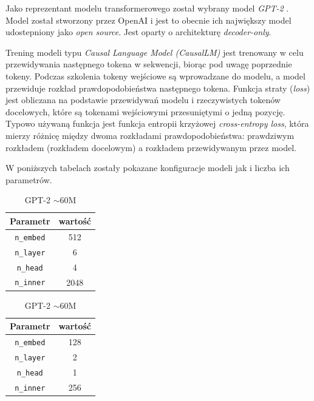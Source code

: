 \documentclass[data-science]{agh-wi} %
\begin{document}
Jako reprezentant modelu transformerowego został wybrany model \textit{GPT-2} \cite{gpt2}. Model został stworzony przez OpenAI i jest to obecnie ich największy model udostepniony jako \textit{open source}. Jest oparty o architekturę \textit{decoder-only}.

Trening modeli typu \textit{Causal Language Model (CausalLM)} jest trenowany w celu przewidywania następnego tokena w sekwencji, biorąc pod uwagę poprzednie tokeny. Podczas szkolenia tokeny wejściowe są wprowadzane do modelu, a model przewiduje rozkład prawdopodobieństwa następnego tokena. Funkcja straty (\textit{loss}) jest obliczana na podstawie przewidywań modelu i rzeczywistych tokenów docelowych, które są tokenami wejściowymi przesuniętymi o jedną pozycję. Typowo używaną funkcja jest funkcja entropii krzyżowej \textit{cross-entropy loss}, która mierzy różnicę między dwoma rozkładami prawdopodobieństwa: prawdziwym rozkładem (rozkładem docelowym) a rozkładem przewidywanym przez model.

W poniższych tabelach zostały pokazane konfiguracje modeli jak i liczba ich parametrów.

\begin{table}[!htb]
    \begin{minipage}{.5\linewidth}
        \caption{GPT-2 $\sim$6M}
        \centering
        \begin{tabular}{||c c||}
            \hline
            Parametr          & wartość \\ [0.5ex]
            \hline\hline
            \texttt{n\_embed} & 512     \\
            \hline
            \texttt{n\_layer} & 6       \\
            \hline
            \texttt{n\_head}  & 4       \\
            \hline
            \texttt{n\_inner} & 2048    \\
            \hline
        \end{tabular}
    \end{minipage}%
    \begin{minipage}{.5\linewidth}
        \centering
        \caption{GPT-2 $\sim$60M}
        \begin{tabular}{||c c||}
            \hline
            Parametr          & wartość \\ [0.5ex]
            \hline\hline
            \texttt{n\_embed} & 128     \\
            \hline
            \texttt{n\_layer} & 2       \\
            \hline
            \texttt{n\_head}  & 1       \\
            \hline
            \texttt{n\_inner} & 256     \\
            \hline
        \end{tabular}
    \end{minipage}
\end{table}
\end{document}
